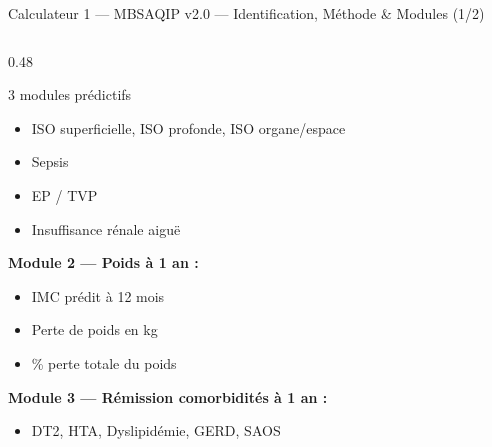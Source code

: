 \documentclass[aspectratio=169]{beamer}
\newcommand{\tightlist}{%
  \setlength{\itemsep}{1pt}\setlength{\parskip}{0pt}%
  \setlength{\parsep}{0pt}\setlength{\topsep}{2pt}}
\begin{document}
\begin{frame}{Calculateur 1 --- MBSAQIP v2.0 --- Identification, Méthode \& Modules (1/2)}
\begin{columns}[T]
\begin{column}{0.48\textwidth}
\begin{block}{3 modules prédictifs}
\begin{itemize}
          \item ISO superficielle, ISO profonde, ISO organe/espace
          \item Sepsis
          \item EP / TVP
          \item Insuffisance rénale aiguë
        \end{itemize}
        \vspace{4pt}
        \textbf{Module 2 --- Poids à 1 an :}
        \begin{itemize}\tightlist
          \item IMC prédit à 12 mois
          \item Perte de poids en kg
          \item \% perte totale du poids
        \end{itemize}
        \vspace{4pt}
        \textbf{Module 3 --- Rémission comorbidités à 1 an :}
        \begin{itemize}\tightlist
          \item DT2, HTA, Dyslipidémie, GERD, SAOS
        \end{itemize}
      \end{block}
    \end{column}
  \end{columns}
\end{frame}
\end{document}
